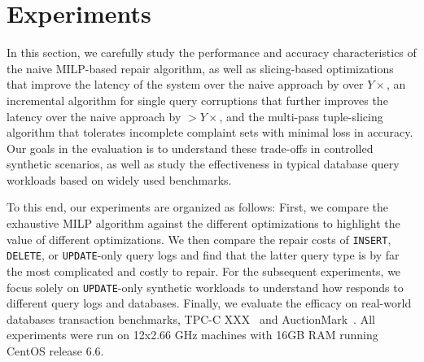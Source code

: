 
%
%
%
%
%
\section{Experiments}



In this section, we carefully study the performance and accuracy
characteristics of the naive MILP-based repair algorithm, as well as 
slicing-based optimizations that improve the latency of the system over the naive
approach by over $Y\times$, an incremental algorithm for single query corruptions that
further improves the latency over the naive approach by $>Y\times$, and 
the multi-pass tuple-slicing algorithm that tolerates incomplete complaint sets with minimal loss in accuracy.
Our goals in the evaluation is to understand these trade-offs in
controlled synthetic scenarios, as well as study the effectiveness
in typical database query workloads based on widely used benchmarks.

To this end, our experiments are organized as follows: First, 
we compare the exhaustive MILP algorithm against the different optimizations 
to highlight the value of different optimizations.  We then compare the
repair costs of \texttt{INSERT}, \texttt{DELETE}, or \texttt{UPDATE}-only query logs 
and find that the latter query type is by far the most complicated and costly to repair.
For the subsequent experiments, we focus solely on \texttt{UPDATE}-only synthetic workloads 
to understand how \sys responds to different query logs and databases.  
Finally, we evaluate the efficacy on real-world databases transaction benchmarks,
TPC-C XXX~\cite{tpcc} and AuctionMark~\cite{auctionmark}.
All experiments were run on 12x2.66 GHz  machines with 16GB RAM running CentOS release 6.6.







